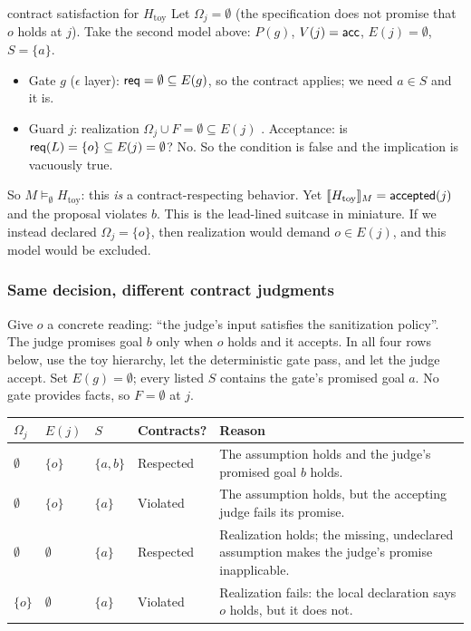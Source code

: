 \begin{example}{contract satisfaction for $H_{\mathrm{toy}}$}
Let $\Omega_j=\emptyset$ (the specification does not promise that $o$ holds at $j$). Take the second model above: $P(g)$, $V(j)=\mathsf{acc}$, $E(j)=\emptyset$, $S=\{a\}$.
\begin{itemize}
\item Gate $g$ ($\epsilon$ layer): $\mathsf{req}=\emptyset\subseteq E(g)$, so the contract applies; we need $a\in S$ and it is. \checkmark
\item Guard $j$: realization $\Omega_j\cup F=\emptyset\subseteq E(j)$ \checkmark. Acceptance: is $\mathsf{req}(L)=\{o\}\subseteq E(j)=\emptyset$? No. So the condition is false and the implication is vacuously true. \checkmark
\end{itemize}
So $M\models_\emptyset H_{\mathrm{toy}}$: this \emph{is} a contract-respecting behavior. Yet $\llbracket H_{\mathrm{toy}}\rrbracket_{M}=\mathsf{accepted}(j)$ and the proposal violates $b$. This is the lead-lined suitcase in miniature. If we instead declared $\Omega_j=\{o\}$, then realization would demand $o\in E(j)$, and this model would be excluded.
\end{example}

\subsubsection{Same decision, different contract judgments}
\label{sec:contracts-versus-safety}

Give $o$ a concrete reading: ``the judge's input satisfies the sanitization policy''. The judge promises goal $b$ only when $o$ holds and it accepts. In all four rows below, use the toy hierarchy, let the deterministic gate pass, and let the judge accept. Set $E(g)=\emptyset$; every listed $S$ contains the gate's promised goal $a$. No gate provides facts, so $F=\emptyset$ at $j$.

\begin{center}
\renewcommand{\arraystretch}{1.25}
\begin{tabularx}{\textwidth}{@{}llllX@{}}
\toprule
$\Omega_j$ & $E(j)$ & $S$ & \textbf{Contracts?} & \textbf{Reason}\\
\midrule
$\emptyset$ & $\{o\}$ & $\{a,b\}$ & Respected & The assumption holds and the judge's promised goal $b$ holds.\\
$\emptyset$ & $\{o\}$ & $\{a\}$ & Violated & The assumption holds, but the accepting judge fails its promise.\\
$\emptyset$ & $\emptyset$ & $\{a\}$ & Respected & Realization holds; the missing, undeclared assumption makes the judge's promise inapplicable.\\
$\{o\}$ & $\emptyset$ & $\{a\}$ & Violated & Realization fails: the local declaration says $o$ holds, but it does not.\\
\bottomrule
\end{tabularx}
\end{center}

